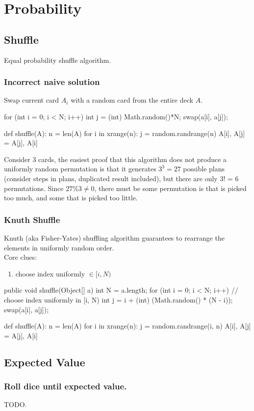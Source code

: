 \chapter{Probability}


\section{Shuffle}
Equal probability shuffle algorithm.

\subsection{Incorrect naive solution}
Swap current card $A_i$ with a random card from the entire deck $A$. 
\begin{java}
for (int i = 0; i < N; i++) {
   int j = (int) Math.random()*N;
   swap(a[i], a[j]);
}
\end{java}
\begin{python}
def shuffle(A):
  n = len(A)
  for i in xrange(n):
    j = random.randrange(n)
    A[i], A[j] = A[j], A[i]
\end{python}
Consider 3 cards, the easiest proof that this algorithm does not produce a uniformly random permutation is that it generates $3^3=27$ possible plans (consider steps in plans, duplicated result included), but there are only 3! = 6 permutations. Since $27\%3 \neq 0$, there must be some permutation is that is picked too much, and some that is picked too little.
\subsection{Knuth Shuffle}
Knuth (aka Fisher-Yates) shuffling algorithm guarantees to rearrange the elements in uniformly random order. 
\\
Core clues:
\begin{enumerate}
\item choose index uniformly $\in [i, N)$
\end{enumerate}
\begin{java}
public void shuffle(Object[] a) {
    int N = a.length;
    for (int i = 0; i < N; i++) {
        // choose index uniformly in [i, N)
        int j = i + (int) (Math.random() * (N - i));
        swap(a[i], a[j]);
    }
}
\end{java}

\begin{python}
def shuffle(A):
  n = len(A)
  for i in xrange(n):
    j = random.randrange(i, n)
    A[i], A[j] = A[j], A[i]
\end{python}
\section{Expected Value}
\subsection{Roll dice until expected value.}
TODO.
